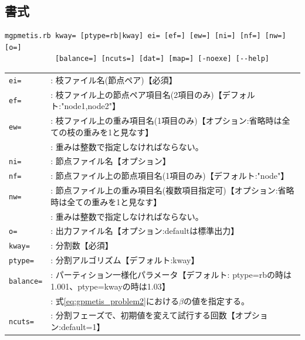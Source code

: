 \subsection{書式}
\begin{verbatim}
mgpmetis.rb kway= [ptype=rb|kway] ei= [ef=] [ew=] [ni=] [nf=] [nw=] [o=]
            [balance=] [ncuts=] [dat=] [map=] [-noexe] [--help]
\end{verbatim}

\begin{table}[htbp]
{\small
\begin{tabular}{ll}
\verb|ei=|    & : 枝ファイル名(節点ペア)【必須】 \\
\verb|ef=|    & : 枝ファイル上の節点ペア項目名(2項目のみ)【デフォルト:"node1,node2"】 \\
\verb|ew=|    & : 枝ファイル上の重み項目名(1項目のみ)【オプション:省略時は全ての枝の重みを1と見なす】 \\
              & : 重みは整数で指定しなければならない。 \\
\verb|ni=|    & : 節点ファイル名【オプション】 \\
\verb|nf=|    & : 節点ファイル上の節点項目名(1項目のみ)【デフォルト:"node"】 \\
\verb|nw=|    & : 節点ファイル上の重み項目名(複数項目指定可)【オプション:省略時は全ての重みを1と見なす】 \\
              & : 重みは整数で指定しなければならない。 \\
\verb|o=|     & : 出力ファイル名【オプション:defaultは標準出力】 \\
\verb|kway=|  & : 分割数【必須】 \\
\verb|ptype=| & : 分割アルゴリズム【デフォルト:kway】 \\
\verb|balance=| & : パーティション一様化パラメータ【デフォルト: ptype=rbの時は1.001、ptype=kwayの時は1.03】 \\
              & : 式\ref{eq:gpmetis_problem2}における$\beta$の値を指定する。 \\
\verb|ncuts=| & : 分割フェーズで、初期値を変えて試行する回数【オプション:default=1】\\


\end{tabular}}
\end{table}
